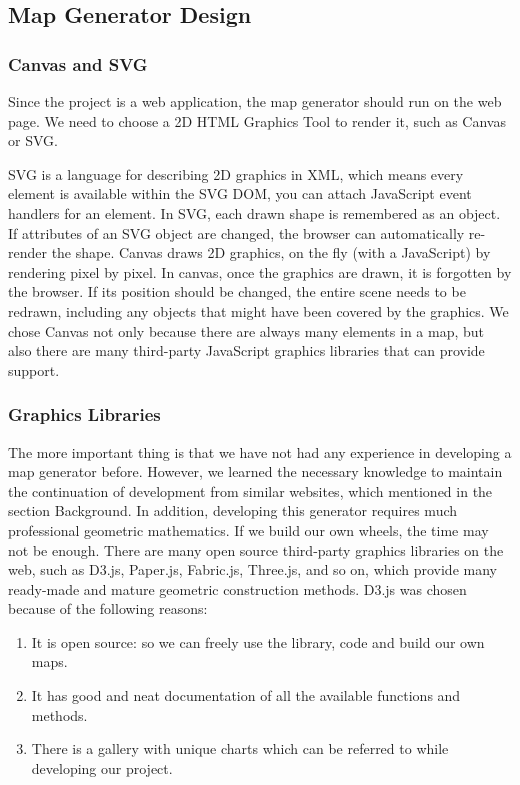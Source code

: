\subsection{Map Generator Design}
\label{sec:Design>Map Generator Design}
\subsubsection{Canvas and SVG}
\label{sec:Design>Map Generator Design>Canvas and SVG}
Since the project is a web application, the map generator should run on the web page. We need to choose a 2D HTML Graphics Tool to render it, such as Canvas or SVG.

SVG is a language for describing 2D graphics in XML, which means every element is available within the SVG DOM, you can attach JavaScript event handlers for an element. In SVG, each drawn shape is remembered as an object. If attributes of an SVG object are changed, the browser can automatically re-render the shape. Canvas draws 2D graphics, on the fly (with a JavaScript) by rendering pixel by pixel. In canvas, once the graphics are drawn, it is forgotten by the browser. If its position should be changed, the entire scene needs to be redrawn, including any objects that might have been covered by the graphics. We chose Canvas not only because there are always many elements in a map, but also there are many third-party JavaScript graphics libraries that can provide support.

\subsubsection{Graphics Libraries}
\label{sec:Design>Map Generator Design>Graphics Libraries}
The more important thing is that we have not had any experience in developing a map generator before. However, we learned the necessary knowledge to maintain the continuation of development from similar websites, which mentioned in the section Background. In addition, developing this generator requires much professional geometric mathematics. If we build our own wheels, the time may not be enough. There are many open source third-party graphics libraries on the web, such as D3.js, Paper.js, Fabric.js, Three.js, and so on, which provide many ready-made and mature geometric construction methods. D3.js was chosen because of the following reasons:
\begin{enumerate}
  \item It is open source: so we can freely use the library, code and build our own maps.
  \item It has good and neat documentation of all the available functions and methods.
  \item There is a gallery with unique charts which can be referred to while developing our project.
\end{enumerate}

